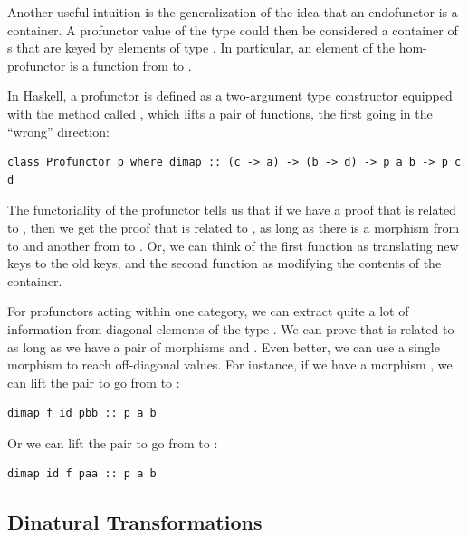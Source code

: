 Another useful intuition is the generalization of the idea that an
endofunctor is a container. A profunctor value of the type
 could then be considered a container of s
that are keyed by elements of type . In particular, an element
of the hom-profunctor is a function from  to .

In Haskell, a profunctor is defined as a two-argument type constructor
 equipped with the method called , which lifts a
pair of functions, the first going in the ``wrong'' direction:

\begin{verbatim}
class Profunctor p where dimap :: (c -> a) -> (b -> d) -> p a b -> p c d
\end{verbatim}

The functoriality of the profunctor tells us that if we have a proof
that  is related to , then we get the proof that
 is related to , as long as there is a morphism from
 to  and another from  to . Or,
we can think of the first function as translating new keys to the old
keys, and the second function as modifying the contents of the
container.

For profunctors acting within one category, we can extract quite a lot
of information from diagonal elements of the type . We
can prove that  is related to  as long as we have a
pair of morphisms  and
. Even better, we can use a single morphism to
reach off-diagonal values. For instance, if we have a morphism
, we can lift the pair
 to go from  to
:

\begin{verbatim}
dimap f id pbb :: p a b
\end{verbatim}

Or we can lift the pair  to go
from  to :

\begin{verbatim}
dimap id f paa :: p a b
\end{verbatim}

\subsection{Dinatural Transformations}\label{dinatural-transformations}

